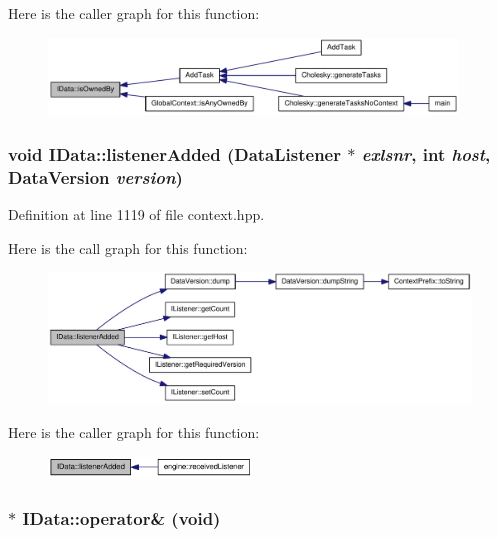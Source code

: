 Here is the caller graph for this function:\nopagebreak
\begin{figure}[H]
\begin{center}
\leavevmode
\includegraphics[width=308pt]{class_i_data_a11fc47fc59754a19a489c464be31330e_icgraph}
\end{center}
\end{figure}
\hypertarget{class_i_data_aee488e868fa96b016a0f546fc485f6d7}{
\subsubsection[{listenerAdded}]{\setlength{\rightskip}{0pt plus 5cm}void IData::listenerAdded ({\bf DataListener} $\ast$ {\em exlsnr}, \/  int {\em host}, \/  {\bf DataVersion} {\em version})}}
\label{class_i_data_aee488e868fa96b016a0f546fc485f6d7}


Definition at line 1119 of file context.hpp.

Here is the call graph for this function:\nopagebreak
\begin{figure}[H]
\begin{center}
\leavevmode
\includegraphics[width=323pt]{class_i_data_aee488e868fa96b016a0f546fc485f6d7_cgraph}
\end{center}
\end{figure}


Here is the caller graph for this function:\nopagebreak
\begin{figure}[H]
\begin{center}
\leavevmode
\includegraphics[width=154pt]{class_i_data_aee488e868fa96b016a0f546fc485f6d7_icgraph}
\end{center}
\end{figure}
\hypertarget{class_i_data_a7c40c89c675a4b52bfc1511fbe36a375}{
\subsubsection[{operator\&}]{$\ast$ IData::operator\& (void)}}
\label{class_i_data_a7c40c89c675a4b52bfc1511fbe36a375}


